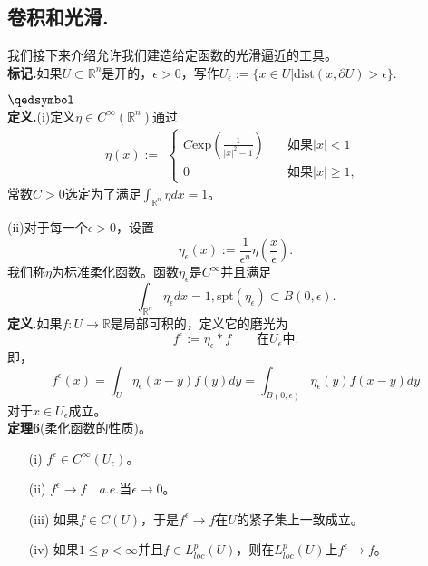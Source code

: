 \documentclass[leqno]{article}%
\begin{document}
\subsection{卷积和光滑.}
我们接下来介绍允许我们建造给定函数的光滑逼近的工具。\\
\textbf{标记.}如果$U\subset\mathbb{R}^{n}$是开的，$\epsilon>0$，写作$U_{\epsilon}:=\{x\in U|\text{dist}(x,\partial U)>\epsilon\}$.\par
 $\hfill\qedsymbol$
\\ \textbf{定义.}(i)定义$\eta\in C^{\infty}\left(\mathbb{R}^{n}\right)$通过
\begin{equation*}
\eta(x):=
\begin{aligned}
\begin{cases}
C\text{exp}\left(\frac{1}{|x|^{2}-1}\right)\quad &\text{如果}|x|<1\\
0\quad&\text{如果}|x|\geq 1,
\end{cases}
\end{aligned}
\end{equation*}
常数$C>0$选定为了满足$\int_{\mathbb{R}^{n}}\eta dx=1$。\par
(ii)对于每一个$\epsilon>0$，设置
\begin{equation*}
\eta_{\epsilon}(x):=\frac{1}{\epsilon^{n}}\eta\left(\frac{x}{\epsilon}\right).
\end{equation*}
	我们称$\eta$为标准柔化函数。函数$\eta_{\epsilon}$是$C^{\infty}$并且满足
	\begin{equation*}
	\int_{\mathbb{R}^{n}}\eta_{\epsilon}dx=1,\text{spt}\left(\eta_{\epsilon}\right)\subset B(0,\epsilon).
	\end{equation*}
\textbf{定义.}如果$f:U\rightarrow\mathbb{R}$是局部可积的，定义它的磨光为
\begin{equation*}
f^{\epsilon}:=\eta_{\epsilon}*f\qquad\text{在}U_{\epsilon}\text{中}.
\end{equation*}
即，
\begin{equation*}
f^{\epsilon}(x)=\int_{U}\eta_{\epsilon}(x-y)f(y)dy=\int_{B(0,\epsilon)}\eta_{\epsilon}(y)f(x-y)dy
\end{equation*}
对于$x\in U_{\epsilon}$成立。\\
\textbf{定理6}(柔化函数的性质)。
\begin{enumerate}[fullwidth,itemindent=1em]
	\item[(i)]$f^{\epsilon}\in C^{\infty}\left(U_{\epsilon}\right)$。
	\item[(ii)]$f^{\epsilon}\rightarrow f\quad a.e. \text{当}\epsilon\rightarrow0$。 
	\item[(iii)]如果$f\in C(U)$，于是$f^{\epsilon}\rightarrow f$在$U$的紧子集上一致成立。
	\item[(iv)]如果$1\leq p<\infty$并且$f\in L_{loc}^{p}(U)$，则在$L_{loc}^{p}(U)$上$f^{\epsilon}\rightarrow f$。
\end{enumerate}
\end{document}
